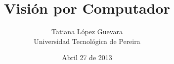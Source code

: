 



\title{\textbf{Visión por Computador}}
\author{Tatiana López Guevara\\Universidad Tecnológica de Pereira}
\date{Abril 27 de 2013}
\maketitle













